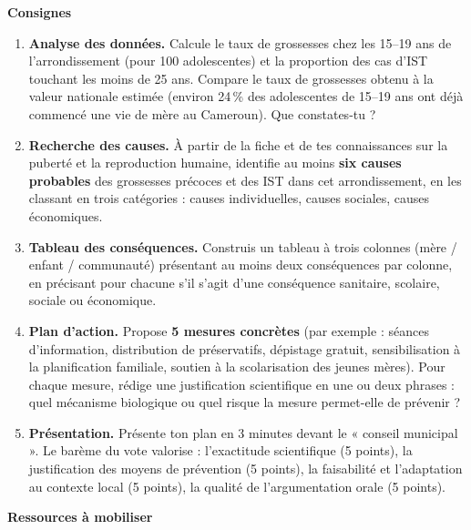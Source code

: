 \documentclass[11pt]{article}
\begin{document}
\textbf{Consignes}\par

\begin{enumerate}
\item \textbf{Analyse des données.} Calcule le taux de grossesses chez les 15--19 ans de l'arrondissement (pour 100 adolescentes) et la proportion des cas d'IST touchant les moins de 25 ans. Compare le taux de grossesses obtenu à la valeur nationale estimée (environ 24\,\% des adolescentes de 15--19 ans ont déjà commencé une vie de mère au Cameroun). Que constates-tu ?
\item \textbf{Recherche des causes.} À partir de la fiche et de tes connaissances sur la puberté et la reproduction humaine, identifie au moins \textbf{six causes probables} des grossesses précoces et des IST dans cet arrondissement, en les classant en trois catégories : causes individuelles, causes sociales, causes économiques.
\item \textbf{Tableau des conséquences.} Construis un tableau à trois colonnes (mère / enfant / communauté) présentant au moins deux conséquences par colonne, en précisant pour chacune s'il s'agit d'une conséquence sanitaire, scolaire, sociale ou économique.
\item \textbf{Plan d'action.} Propose \textbf{5 mesures concrètes} (par exemple : séances d'information, distribution de préservatifs, dépistage gratuit, sensibilisation à la planification familiale, soutien à la scolarisation des jeunes mères). Pour chaque mesure, rédige une justification scientifique en une ou deux phrases : quel mécanisme biologique ou quel risque la mesure permet-elle de prévenir ?
\item \textbf{Présentation.} Présente ton plan en 3 minutes devant le « conseil municipal ». Le barème du vote valorise : l'exactitude scientifique (5 points), la justification des moyens de prévention (5 points), la faisabilité et l'adaptation au contexte local (5 points), la qualité de l'argumentation orale (5 points).
\end{enumerate}

\textbf{Ressources à mobiliser}\par
\end{document}
